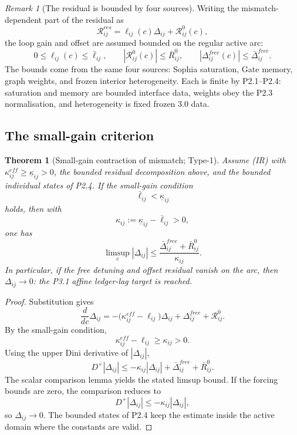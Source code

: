 \documentclass[11pt,a4paper]{article}
\def\mathfrak#1{#1}%
\def\mathrm#1{#1}%
\theoremstyle{definition}
\theoremstyle{plain}
\newtheorem{theorem}[definition]{Theorem}
\theoremstyle{remark}
\newtheorem{remark}[definition]{Remark}
\begin{document}
\begin{remark}[The residual is bounded by four sources]\label{rem:residual}
Writing the mismatch-dependent part of the residual as
\[
\mathcal R^{\mathrm{res}}_{ij}
=
\ell_{ij}(\mathfrak c)\Delta_{ij}
+
\mathcal R^{0}_{ij}(\mathfrak c),
\]
the loop gain and offset are assumed bounded on the regular active arc:
\[
0\le \ell_{ij}(\mathfrak c)\le \bar\ell_{ij},
\qquad
|\mathcal R^0_{ij}(\mathfrak c)|\le \bar R^0_{ij},
\qquad
|\Delta^{\mathrm{free}}_{ij}(\mathfrak c)|\le \bar\Delta^{\mathrm{free}}_{ij}.
\]
The bounds come from the same four sources: Sophia saturation, Gate memory,
graph weights, and frozen interior heterogeneity. Each is finite by P2.1--P2.4:
saturation and memory are bounded interface data, weights obey the P2.3
normalisation, and heterogeneity is fixed frozen 3.0 data.
\end{remark}

\subsection{The small-gain criterion}

\begin{theorem}[Small-gain contraction of mismatch; Type-1]\label{thm:smallgain}
Assume \textup{(IR)} with \(\kappa^{\mathrm{eff}}_{ij}\ge\underline\kappa_{ij}>0\),
the bounded residual decomposition above, and the bounded individual states of
P2.4. If the small-gain condition
\[
\boxed{\;
\bar\ell_{ij}<\underline\kappa_{ij}
\;}
\]
holds, then with
\[
\kappa_{ij}:=\underline\kappa_{ij}-\bar\ell_{ij}>0,
\]
one has
\[
\limsup_{\mathfrak c}|\Delta_{ij}|
\le
\frac{\bar\Delta^{\mathrm{free}}_{ij}+\bar R^0_{ij}}{\kappa_{ij}}.
\]
In particular, if the free detuning and offset residual vanish on the arc, then
\(\Delta_{ij}\to0\): the P3.1 affine ledger-lag target is reached.
\end{theorem}

\begin{proof}
Substitution gives
\[
\frac{d}{d\mathfrak c}\Delta_{ij}
=
-\bigl(\kappa^{\mathrm{eff}}_{ij}-\ell_{ij}\bigr)\Delta_{ij}
+\Delta^{\mathrm{free}}_{ij}
+\mathcal R^0_{ij}.
\]
By the small-gain condition,
\[
\kappa^{\mathrm{eff}}_{ij}-\ell_{ij}\ge\kappa_{ij}>0.
\]
Using the upper Dini derivative of \(|\Delta_{ij}|\),
\[
D^+|\Delta_{ij}|
\le
-\kappa_{ij}|\Delta_{ij}|
+\bar\Delta^{\mathrm{free}}_{ij}
+\bar R^0_{ij}.
\]
The scalar comparison lemma yields the stated limsup bound. If the forcing bounds
are zero, the comparison reduces to
\[
D^+|\Delta_{ij}|\le-\kappa_{ij}|\Delta_{ij}|,
\]
so \(\Delta_{ij}\to0\). The bounded states of P2.4 keep the estimate inside the
active domain where the constants are valid. \qedhere
\end{proof}
\end{document}
